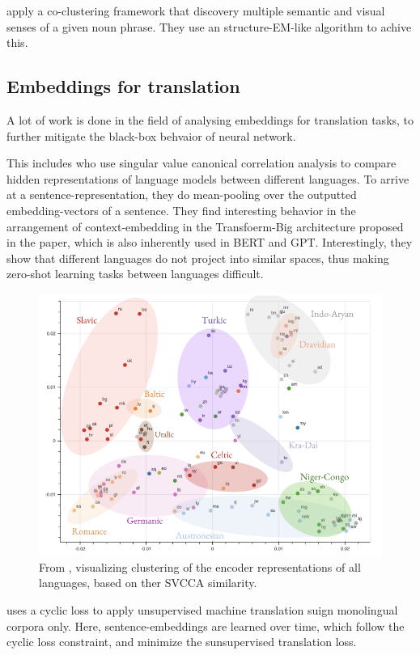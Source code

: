 \documentclass[a4paper,12pt,twoside,openright]{report}
\begin{document}
\cite{chen19} apply a co-clustering framework that discovery multiple semantic and visual senses of a given noun phrase.
They use an structure-EM-like algorithm to achive this.

\subsection{Embeddings for translation}

A lot of work is done in the field of analysing embeddings for translation tasks, to further mitigate the black-box behvaior of neural network.

This includes \cite{kudugunta18} who use singular value canonical correlation analysis to compare hidden representations of language models between different languages.
To arrive at a sentence-representation, they do mean-pooling over the outputted embedding-vectors of a sentence. 
They find interesting behavior in the arrangement of context-embedding in the Transfoerm-Big architecture proposed in the \cite{vaswani17} paper, which is also inherently used in BERT and GPT.
Interestingly, they show that different languages do not project into similar spaces, thus making zero-shot learning tasks between languages difficult.


\begin{figure}[h]
	\center
  \includegraphics[width=0.6\linewidth]{./assets/relatedwork/embeddings_by_language.png}
  \caption{From \cite{kudugunta18}, visualizing clustering of the encoder representations of all languages, based on ther SVCCA similarity.}
  \label{fig:embeddings_by_language}
\end{figure}



\cite{lample18} uses a cyclic loss to apply unsupervised machine translation suign monolingual corpora only. 
Here, sentence-embeddings are learned over time, which follow the cyclic loss constraint, and minimize the sunsupervised translation loss.
\end{document}
